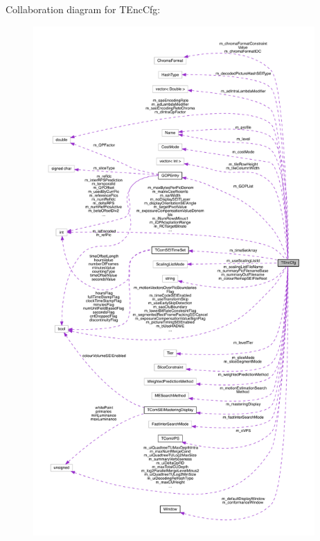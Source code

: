 Collaboration diagram for T\+Enc\+Cfg\+:
\nopagebreak
\begin{figure}[H]
\begin{center}
\leavevmode
\includegraphics[height=550pt]{d1/ddf/class_t_enc_cfg__coll__graph}
\end{center}
\end{figure}
